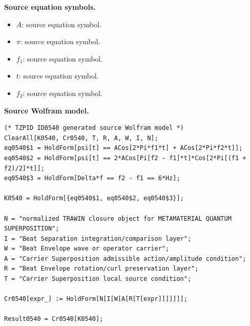 \begin{minipage}[t]{0.49\linewidth}
\begingroup
\small
\raggedright
\textbf{Source equation symbols.}\par
\begin{itemize}[leftmargin=1.35em,itemsep=1pt,topsep=1pt,parsep=0pt]
    \item $A$: source equation symbol.
    \item $\pi$: source equation symbol.
    \item $f_{1}$: source equation symbol.
    \item $t$: source equation symbol.
    \item $f_{2}$: source equation symbol.
\end{itemize}
\endgroup
\end{minipage}\hfill
\begin{minipage}[t]{0.47\linewidth}
\begingroup
\scriptsize
\raggedright
\textbf{Source Wolfram model.}\par
\begin{Verbatim}[fontsize=\tiny,breaklines=true,breakanywhere=true]
(* TZPID ID0540 generated source Wolfram model *)
ClearAll[K0540, Cr0540, T, R, A, W, I, N];
eq0540$1 = HoldForm[psi[t] == ACos[2*Pi*f1*t] + ACos[2*Pi*f2*t]];
eq0540$2 = HoldForm[psi[t] == 2*ACos[Pi[f2 - f1]*t]*Cos[2*Pi[(f1 + f2)/2]*t]];
eq0540$3 = HoldForm[Delta*f == f2 - f1 == 6*Hz];

K0540 = HoldForm[{eq0540$1, eq0540$2, eq0540$3}];

N = "normalized TRAWIN closure object for METAMATERIAL QUANTUM SUPERPOSITION";
I = "Beat Separation integration/comparison layer";
W = "Beat Envelope wave or operator carrier";
A = "Carrier Superposition admissible action/amplitude condition";
R = "Beat Envelope rotation/curl preservation layer";
T = "Carrier Superposition local source condition";

Cr0540[expr_] := HoldForm[N[I[W[A[R[T[expr]]]]]]];

Result0540 = Cr0540[K0540];
\end{Verbatim}
\endgroup
\end{minipage}

